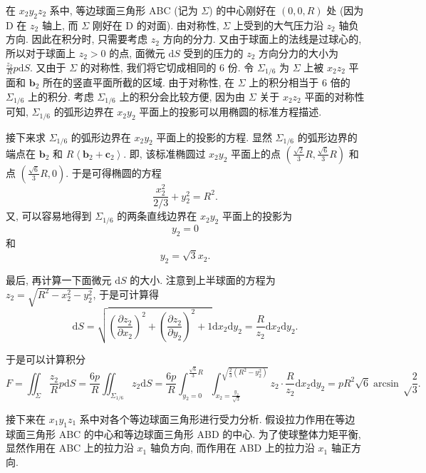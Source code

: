 \documentclass{article}
\begin{document}
在 $x_2y_2z_2$ 系中, 等边球面三角形 ABC (记为 $\Sigma$) 的中心刚好在 $\left(0,0,R\right)$ 处
(因为 D 在 $z_2$ 轴上, 而 $\Sigma$ 刚好在 D 的对面).
由对称性, $\Sigma$ 上受到的大气压力沿 $z_2$ 轴负方向.
因此在积分时, 只需要考虑 $z_2$ 方向的分力.
又由于球面上的法线是过球心的, 所以对于球面上 $z_2>0$ 的点,
面微元 $\mathrm dS$ 受到的压力的 $z_2$ 方向分力的大小为 $\frac{z_2}Rp\mathrm dS$.
又由于 $\Sigma$ 的对称性, 我们将它切成相同的 $6$ 份.
令 $\Sigma_{1/6}$ 为 $\Sigma$ 上被 $x_2z_2$ 平面和 $\mathbf b_2$ 所在的竖直平面所截的区域.
由于对称性, 在 $\Sigma$ 上的积分相当于 $6$ 倍的 $\Sigma_{1/6}$ 上的积分.
考虑 $\Sigma_{1/6}$ 上的积分会比较方便,
因为由 $\Sigma$ 关于 $x_2z_2$ 平面的对称性可知,
$\Sigma_{1/6}$ 的弧形边界在 $x_2y_2$ 平面上的投影可以用椭圆的标准方程描述.

接下来求 $\Sigma_{1/6}$ 的弧形边界在 $x_2y_2$ 平面上的投影的方程.
显然 $\Sigma_{1/6}$ 的弧形边界的端点在 $\mathbf b_2$ 和 $R\left<\mathbf b_2+\mathbf c_2\right>$.
即, 该标准椭圆过 $x_2y_2$ 平面上的点 $\left(\frac{\sqrt2}3R,\frac{\sqrt6}3R\right)$
和点 $\left(\frac{\sqrt6}3R,0\right)$.
于是可得椭圆的方程
\begin{equation}
	\frac{x_2^2}{2/3}+y_2^2=R^2.
\end{equation}
又, 可以容易地得到 $\Sigma_{1/6}$ 的两条直线边界在 $x_2y_2$ 平面上的投影为
\begin{equation}
	y_2=0
\end{equation}
和
\begin{equation}
	y_2=\sqrt3x_2.
\end{equation}

最后, 再计算一下面微元 $\mathrm dS$ 的大小.
注意到上半球面的方程为 $z_2=\sqrt{R^2-x_2^2-y_2^2}$, 于是可计算得
\begin{equation}
	\mathrm dS=\sqrt{
		\left(\frac{\partial z_2}{\partial x_2}\right)^2+
		\left(\frac{\partial z_2}{\partial y_2}\right)^2+1
	}\mathrm dx_2\mathrm dy_2=\frac R{z_2}\mathrm dx_2\mathrm dy_2.
\end{equation}

于是可以计算积分
\begin{equation}
	F=\iint_{\Sigma}\frac{z_2}Rp\mathrm dS
	=\frac{6p}R\iint_{\Sigma_{1/6}}z_2\mathrm dS
	=\frac{6p}R\int_{y_2=0}^{\frac{\sqrt6}3R}
		\int_{x_2=\frac{y_2}{\sqrt3}}^{\sqrt{\frac23\left(R^2-y_2^2\right)}}
		z_2\cdot\frac R{z_2}\mathrm dx_2\mathrm dy_2
	=pR^2\sqrt6\arcsin\sqrt\frac23.
	\label{eq:大气压力}
\end{equation}

接下来在 $x_1y_1z_1$ 系中对各个等边球面三角形进行受力分析.
假设拉力作用在等边球面三角形 ABC 的中心和等边球面三角形 ABD 的中心.
为了使球整体力矩平衡, 显然作用在 ABC 上的拉力沿 $x_1$ 轴负方向, 而作用在 ABD 上的拉力沿 $x_1$ 轴正方向.
\end{document}
